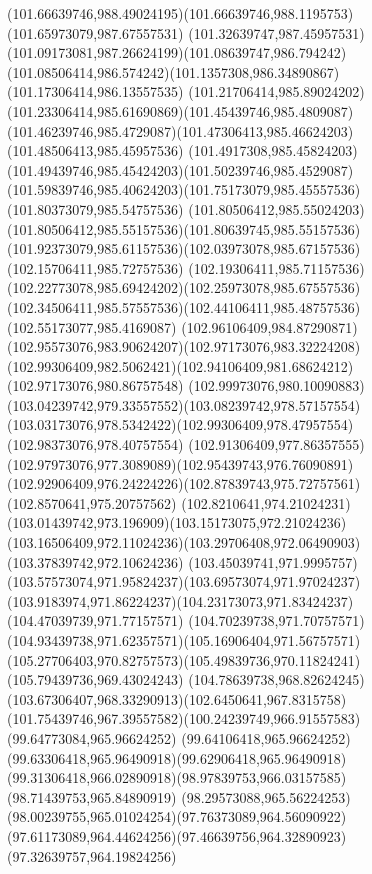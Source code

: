 {{	\curveto(101.66639746,988.49024195)(101.66639746,988.1195753)(101.65973079,987.67557531)
	\curveto(101.32639747,987.45957531)(101.09173081,987.26624199)(101.08639747,986.794242)
	\curveto(101.08506414,986.574242)(101.1357308,986.34890867)(101.17306414,986.13557535)
	\curveto(101.21706414,985.89024202)(101.23306414,985.61690869)(101.45439746,985.4809087)
	\curveto(101.46239746,985.4729087)(101.47306413,985.46624203)(101.48506413,985.45957536)
	\curveto(101.4917308,985.45824203)(101.49439746,985.45424203)(101.50239746,985.4529087)
	\curveto(101.59839746,985.40624203)(101.75173079,985.45557536)(101.80373079,985.54757536)
	\curveto(101.80506412,985.55024203)(101.80506412,985.55157536)(101.80639745,985.55157536)
	\curveto(101.92373079,985.61157536)(102.03973078,985.67157536)(102.15706411,985.72757536)
	\curveto(102.19306411,985.71157536)(102.22773078,985.69424202)(102.25973078,985.67557536)
	\curveto(102.34506411,985.57557536)(102.44106411,985.48757536)(102.55173077,985.4169087)
	\curveto(102.96106409,984.87290871)(102.95573076,983.90624207)(102.97173076,983.32224208)
	\curveto(102.99306409,982.5062421)(102.94106409,981.68624212)(102.97173076,980.86757548)
	\curveto(102.99973076,980.10090883)(103.04239742,979.33557552)(103.08239742,978.57157554)
	\curveto(103.03173076,978.5342422)(102.99306409,978.47957554)(102.98373076,978.40757554)
	\curveto(102.91306409,977.86357555)(102.97973076,977.3089089)(102.95439743,976.76090891)
	\curveto(102.92906409,976.24224226)(102.87839743,975.72757561)(102.8570641,975.20757562)
	\curveto(102.8210641,974.21024231)(103.01439742,973.196909)(103.15173075,972.21024236)
	\curveto(103.16506409,972.11024236)(103.29706408,972.06490903)(103.37839742,972.10624236)
	\curveto(103.45039741,971.9995757)(103.57573074,971.95824237)(103.69573074,971.97024237)
	\curveto(103.9183974,971.86224237)(104.23173073,971.83424237)(104.47039739,971.77157571)
	\curveto(104.70239738,971.70757571)(104.93439738,971.62357571)(105.16906404,971.56757571)
	\curveto(105.27706403,970.82757573)(105.49839736,970.11824241)(105.79439736,969.43024243)
	\curveto(104.78639738,968.82624245)(103.67306407,968.33290913)(102.6450641,967.8315758)
	\curveto(101.75439746,967.39557582)(100.24239749,966.91557583)(99.64773084,965.96624252)
	\curveto(99.64106418,965.96624252)(99.63306418,965.96490918)(99.62906418,965.96490918)
	\curveto(99.31306418,966.02890918)(98.97839753,966.03157585)(98.71439753,965.84890919)
	\curveto(98.29573088,965.56224253)(98.00239755,965.01024254)(97.76373089,964.56090922)
	\curveto(97.61173089,964.44624256)(97.46639756,964.32890923)(97.32639757,964.19824256)
}}
